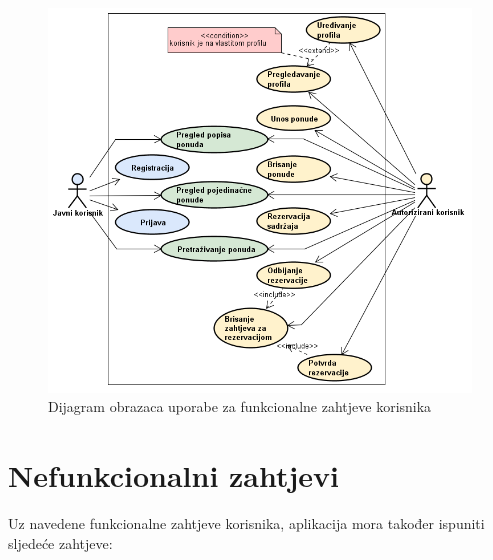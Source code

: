\documentclass[times, utf8, zavrsni, numeric]{fer}
\begin{document}
\begin{figure}[htb]
\centering
\includegraphics[width=14.7cm]{img/use-case.png}
\caption{Dijagram obrazaca uporabe za funkcionalne zahtjeve korisnika}
\label{fig:use-case}
\end{figure}

\newpage


\section{Nefunkcionalni zahtjevi}

Uz navedene funkcionalne zahtjeve korisnika, aplikacija mora također ispuniti sljedeće zahtjeve:
\end{document}
